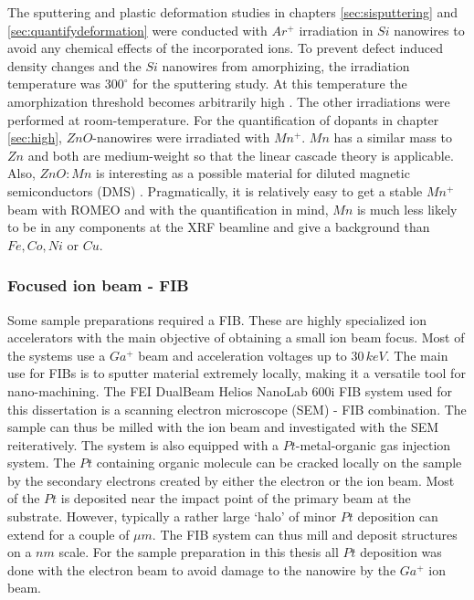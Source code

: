 The sputtering and plastic deformation studies in chapters \ref{sec:sisputtering} and \ref{sec:quantifydeformation} were conducted with $Ar^+$ irradiation in $Si$ nanowires to avoid any chemical effects of the incorporated ions. To prevent defect induced density changes and the $Si$ nanowires from amorphizing, the irradiation temperature was $300^\circ$ for the sputtering study. At this temperature the amorphization threshold becomes arbitrarily high \cite{pelaz_ion-beam-induced_2004}. The other irradiations were performed at room-temperature. For the quantification of dopants in chapter \ref{sec:high}, $ZnO$-nanowires were irradiated with $Mn^+$. $Mn$ has a similar mass to $Zn$ and both are medium-weight so that the linear cascade theory is applicable. Also, $ZnO:Mn$ is interesting as a possible material for diluted magnetic semiconductors (DMS) \cite{furdyna_diluted_1988,norberg_synthesis_2004}. Pragmatically, it is relatively easy to get a stable $Mn^+$ beam with ROMEO and with the quantification in mind, $Mn$ is much less likely to be in any components at the XRF beamline and give a background than $Fe, Co, Ni$ or $Cu$.

 

\subsubsection{Focused ion beam - FIB}

Some sample preparations required a FIB. These are highly specialized ion accelerators with the main objective of obtaining a small ion beam focus. Most of the systems use a $Ga^+$ beam and acceleration voltages up to $30\,keV$. The main use for FIBs is to sputter material extremely locally, making it a versatile tool for nano-machining. The FEI DualBeam Helios NanoLab 600i FIB system used for this dissertation is a scanning electron microscope (SEM) - FIB combination. The sample can thus be milled with the ion beam and investigated with the SEM reiteratively. The system is also equipped with a $Pt$-metal-organic gas injection system. The $Pt$ containing organic molecule can be cracked locally on the sample by the secondary electrons created by either the electron or the ion beam. Most of the $Pt$ is deposited near the impact point of the primary beam at the substrate. However, typically a rather large `halo' of minor $Pt$ deposition can extend for a couple of $\mu m$. The FIB system can thus mill and deposit structures on a $nm$ scale. For the sample preparation in this thesis all $Pt$ deposition was done with the electron beam to avoid damage to the nanowire by the $Ga^+$ ion beam.


